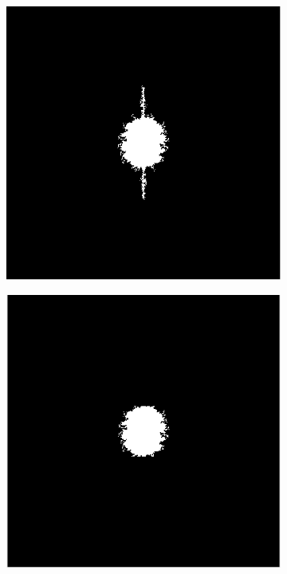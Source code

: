 \documentclass{article}
\begin{document}
\begin{figure}[!htb]
\begin{subfigure}[b]{0.24\textwidth}
                \caption{}
                \label{fig:mouse}
        \end{subfigure}
        \begin{subfigure}[b]{0.24\textwidth}
                \includegraphics[width=\linewidth]{step5}
                \caption{}
                \label{fig:gull}
        \end{subfigure}%
        \hspace{\fill}
        \begin{subfigure}[b]{0.24\textwidth}
                \includegraphics[width=\linewidth]{step6}

\end{subfigure}
\end{figure}
\end{document}
